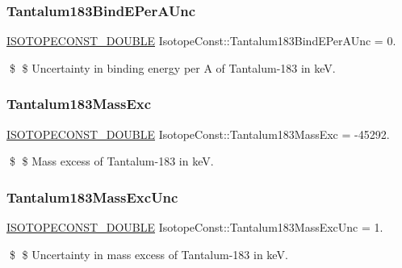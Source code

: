 \subsubsection{\texorpdfstring{Tantalum183\+Bind\+E\+Per\+A\+Unc}{Tantalum183BindEPerAUnc}}
{\footnotesize\ttfamily \mbox{\hyperlink{group___isotope_const-_macros_ga8f45a7272ce02c0b4c65c44636ed719a}{I\+S\+O\+T\+O\+P\+E\+C\+O\+N\+S\+T\+\_\+\+D\+O\+U\+B\+LE}} Isotope\+Const\+::\+Tantalum183\+Bind\+E\+Per\+A\+Unc = 0.}

\$ \$ Uncertainty in binding energy per A of Tantalum-\/183 in keV. \mbox{\label{group___isotope_const-_tantalum-_ta183_gad7df47ce3e4190470bb885b04a2fb468}} 
\subsubsection{\texorpdfstring{Tantalum183\+Mass\+Exc}{Tantalum183MassExc}}
{\footnotesize\ttfamily \mbox{\hyperlink{group___isotope_const-_macros_ga8f45a7272ce02c0b4c65c44636ed719a}{I\+S\+O\+T\+O\+P\+E\+C\+O\+N\+S\+T\+\_\+\+D\+O\+U\+B\+LE}} Isotope\+Const\+::\+Tantalum183\+Mass\+Exc = -\/45292.}

\$ \$ Mass excess of Tantalum-\/183 in keV. \mbox{\label{group___isotope_const-_tantalum-_ta183_gab6f758bc7dbd6ee2e32ec575bead9990}} 
\subsubsection{\texorpdfstring{Tantalum183\+Mass\+Exc\+Unc}{Tantalum183MassExcUnc}}
{\footnotesize\ttfamily \mbox{\hyperlink{group___isotope_const-_macros_ga8f45a7272ce02c0b4c65c44636ed719a}{I\+S\+O\+T\+O\+P\+E\+C\+O\+N\+S\+T\+\_\+\+D\+O\+U\+B\+LE}} Isotope\+Const\+::\+Tantalum183\+Mass\+Exc\+Unc = 1.}

\$ \$ Uncertainty in mass excess of Tantalum-\/183 in keV. \mbox{\label{group___isotope_const-_tantalum-_ta183_ga2ffb1055ad1d2e7b3c294dd1067ef330}} 
